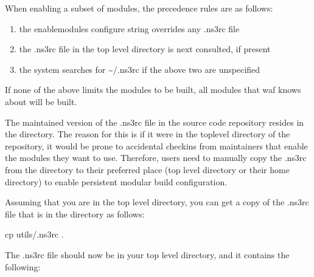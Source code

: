 \documentclass[letterpaper,10pt,english]{sphinxmanual}
\renewcommand{\sphinxcode}[1]{\texttt{\small{#1}}}
\begin{document}
When enabling a subset of  modules, the precedence rules are as follows:
\begin{enumerate}
%
\item {} 
the \textendash{}enable\sphinxhyphen{}modules configure string overrides any .ns3rc file

\item {} 
the .ns3rc file in the top level  directory is next consulted, if present

\item {} 
the system searches for \textasciitilde{}/.ns3rc if the above two are unspecified

\end{enumerate}

If none of the above limits the modules to be built, all modules that waf knows about will be built.

The maintained version of the .ns3rc file in the  source code repository resides in the \sphinxcode{} directory.  The reason for this is if it were in the top\sphinxhyphen{}level directory of the repository, it would be prone to accidental checkins from maintainers that enable the modules they want to use.  Therefore, users need to manually copy the .ns3rc from the \sphinxcode{} directory to their preferred place (top level directory or their home directory) to enable persistent modular build configuration.

Assuming that you are in the top level  directory, you can get a copy of the .ns3rc file that is in the \sphinxcode{} directory as follows:

\begin{sphinxVerbatim}[commandchars=\\\{\}]
\PYGZdl{} cp utils/.ns3rc .
\end{sphinxVerbatim}

The .ns3rc file should now be in your top level  directory, and it contains the following:
\end{document}
